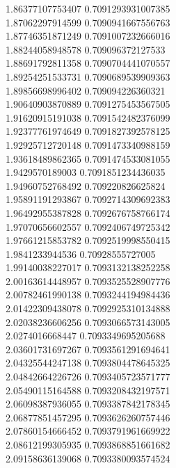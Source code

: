{1.86377107753407 0.7091293931007385 \\
1.87062297914599 0.7090941667556763 \\
1.87746351871249 0.7091007232666016 \\
1.88244058948578 0.709096372127533 \\
1.88691792811358 0.7090704441070557 \\
1.89254251533731 0.7090689539909363 \\
1.89856698996402 0.709094226360321 \\
1.90640903870889 0.7091275453567505 \\
1.91620915191038 0.7091542482376099 \\
1.92377761974649 0.7091827392578125 \\
1.92925712720148 0.7091473340988159 \\
1.93618489862365 0.7091474533081055 \\
1.9429570189003 0.7091851234436035 \\
1.94960752768492 0.709220826625824 \\
1.95891191293867 0.7092714309692383 \\
1.96492955387828 0.7092676758766174 \\
1.97070656602557 0.7092406749725342 \\
1.97661215853782 0.7092519998550415 \\
1.9841233944536 0.70928555727005 \\
1.99140038227017 0.7093132138252258 \\
2.00163614448957 0.7093525528907776 \\
2.00782461990138 0.7093244194984436 \\
2.01422309438078 0.7092925310134888 \\
2.02038236606256 0.7093066573143005 \\
2.0274016668447 0.7093349695205688 \\
2.03601731697267 0.7093561291694641 \\
2.04325544247138 0.7093804478645325 \\
2.04842664226726 0.7093405723571777 \\
2.05490115164588 0.7093208432197571 \\
2.06098387936055 0.7093387842178345 \\
2.06877851457295 0.7093626260757446 \\
2.07860154666452 0.7093791961669922 \\
2.08612199305935 0.7093868851661682 \\
2.09158636139068 0.7093380093574524 \\
}
